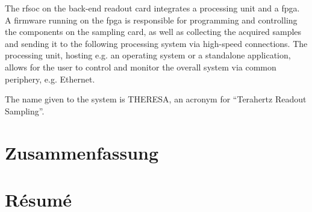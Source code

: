 The \gls{rfsoc} on the back-end readout card integrates a processing unit and a \gls{fpga}. 
A firmware running on the \gls{fpga} is responsible for programming and controlling the components on the sampling card, as well as collecting the acquired samples and sending it to the following processing system via high-speed connections.
The processing unit, hosting e.g. an operating system or a standalone application, allows for the user to control and monitor the overall system via common periphery, e.g. Ethernet.

The name given to the system is THERESA, an acronym for ``Terahertz Readout Sampling''.
\chapter*{Zusammenfassung}
\chapter*{Résumé}